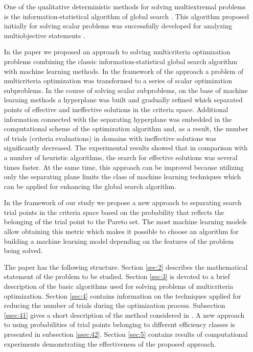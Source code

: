 \documentclass[runningheads]{llncs}
\begin{document}
One of the qualitative deterministic methods for solving multiextremal problems is the  information-statistical algorithm of global search \cite{Strongin2000,Sergeyev2013}. This algorithm proposed initially for solving scalar problems was successfully developed for analyzing multiobjective statements \cite{ML_MCO_2023,Gergel2018,GergelKozinov2020}.

In the paper \cite{ML_MCO_2023} we proposed an approach to solving multicriteria optimization problems combining the classic information-statistical global search algorithm with machine learning methods. In the framework of the approach a problem of multicriteria optimization was transformed to a series of scalar optimization subproblems. In the course of solving scalar subproblems, on the base of machine learning methods a hyperplane was built and gradually refined which separated points of effective and ineffective solutions in the criteria space. Additional information connected with the separating hyperplane was embedded in the computational scheme of the optimization algorithm and, as a result, the number of trials (criteria evaluations) in domains with ineffective solutions was significantly decreased. The experimental results showed that in comparison with a number of heuristic algorithms, the search for effective solutions was several times faster. At the same time, this approach can be improved because utilizing only the separating plane limits the class of machine learning techniques which can be applied for enhancing the global search algorithm.

In the framework of our study we propose a new approach to separating search trial points in the criteria space based on the probability that reflects the belonging of the trial point to the Pareto set. The most machine learning models allow obtaining this metric which makes it possible to choose an algorithm for building a machine learning model depending on the features of the problem being solved.

The paper has the following structure. Section \ref{sec:2} describes the mathematical statement of the problem to be studied. Section \ref{sec:3} is devoted to a brief description of the basic algorithms used for solving problems of multicriteria optimization. Section \ref{sec:4} contains information on the techniques applied for reducing the number of trials during the optimization process. Subsection \ref{ssec:41} gives a short description of the method considered in \cite{ML_MCO_2023}. A new approach to using probabilities of trial points belonging to different efficiency classes is presented in subsection \ref{ssec:42}. Section \ref{sec:5} contains results of computational experiments demonstrating the effectiveness of the proposed approach.
\end{document}
